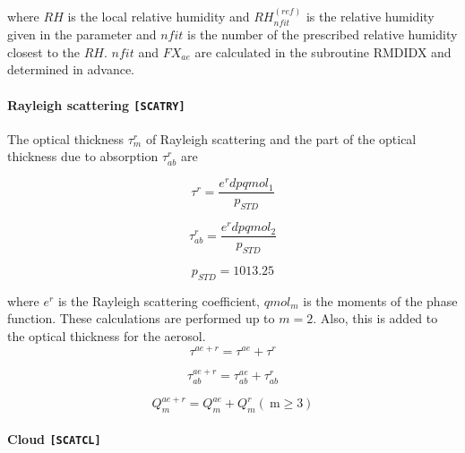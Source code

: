 where \(RH\) is the local relative humidity and
\(R H_{n f i t}^{(r e f)}\) is the relative humidity given in the
parameter and \(nfit\) is the number of the prescribed relative humidity
closest to the \(RH\). \(nfit\) and \(FX_{ae}\) are calculated in the
subroutine RMDIDX and determined in advance.

\hypertarget{rayleigh-scattering-scatry}{%
\paragraph{\texorpdfstring{Rayleigh scattering
\texttt{{[}SCATRY{]}}}{Rayleigh scattering {[}SCATRY{]}}}\label{rayleigh-scattering-scatry}}

The optical thickness \(\tau_{m}^{r}\) of Rayleigh scattering and the
part of the optical thickness due to absorption \(\tau_{ab}^{r}\) are

\begin{equation}
\tau^{r}=\frac{e^{r} d p q m o l_{1}}{p_{S T D}}
\end{equation}

\begin{equation}
\tau_{ab}^{r}=\frac{e^{r} d p q m o l_{2}}{p_{S T D}}
\end{equation}

\begin{equation}
p_{S T D}=1013.25
\end{equation}

where \(e^{r}\) is the Rayleigh scattering coefficient, \(qmol_m\) is
the moments of the phase function. These calculations are performed up
to \(m=2\). Also, this is added to the optical thickness for the
aerosol. \begin{equation}
\tau^{a e+r}=\tau^{a e}+\tau^{r}
\end{equation}

\begin{equation}
\tau_{ab}^{a e+r}=\tau_{ab}^{a e}+\tau_{ab}^{r}
\end{equation}

\begin{equation}
Q_{m}^{a e+r}=Q_{m}^{a e}+Q_{m}^{r}(\mathrm{~m} \geq 3)
\end{equation}

\hypertarget{cloud-scatcl}{%
\paragraph{\texorpdfstring{Cloud
\texttt{{[}SCATCL{]}}}{Cloud {[}SCATCL{]}}}\label{cloud-scatcl}}

